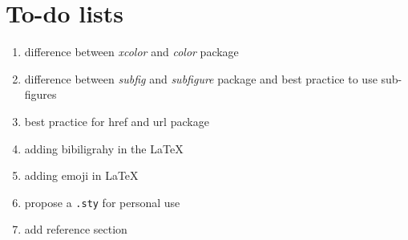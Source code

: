 \section{To-do lists}

\begin{enumerate}
    \item difference between \textit{xcolor} and \textit{color} package
    \item difference between \textit{subfig} and \textit{subfigure} package and best practice to use sub-figures
    \item best practice for href and url package
    \item adding bibiligrahy in the \LaTeX
    \item adding emoji in \LaTeX
    \item propose a \texttt{.sty} for personal use
    \item add reference section
\end{enumerate}